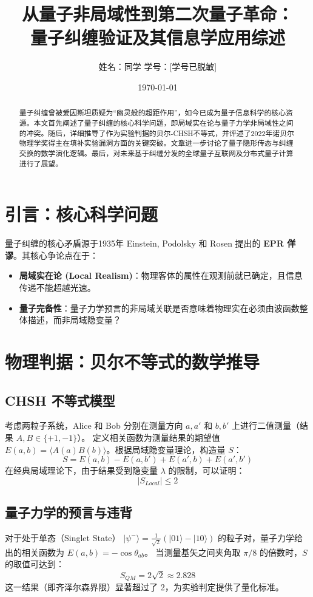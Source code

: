 \documentclass[11pt,a4paper]{article}
\title{\Large \textbf{从量子非局域性到第二次量子革命：\\量子纠缠验证及其信息学应用综述}}
\author{姓名：同学 \quad 学号：[学号已脱敏]}
\date{\today}
\begin{document}
\maketitle

\begin{abstract}
量子纠缠曾被爱因斯坦质疑为“幽灵般的超距作用”，如今已成为量子信息科学的核心资源。本文首先阐述了量子纠缠的核心科学问题，即局域实在论与量子力学非局域性之间的冲突。随后，详细推导了作为实验判据的贝尔-CHSH不等式，并评述了2022年诺贝尔物理学奖得主在填补实验漏洞方面的关键突破。文章进一步讨论了量子隐形传态与纠缠交换的数学演化逻辑。最后，对未来基于纠缠分发的全球量子互联网及分布式量子计算进行了展望。
\end{abstract}

\section{引言：核心科学问题}
量子纠缠的核心矛盾源于1935年 Einstein, Podolsky 和 Rosen 提出的 \textbf{EPR 佯谬}。其核心争论点在于：
\begin{itemize}
    \item \textbf{局域实在论 (Local Realism)}：物理客体的属性在观测前就已确定，且信息传递不能超越光速。
    \item \textbf{量子完备性}：量子力学预言的非局域关联是否意味着物理实在必须由波函数整体描述，而非局域隐变量？
\end{itemize}

\section{物理判据：贝尔不等式的数学推导}


\subsection{CHSH 不等式模型}
考虑两粒子系统，Alice 和 Bob 分别在测量方向 $a, a'$ 和 $b, b'$ 上进行二值测量（结果 $A, B \in \{+1, -1\}$）。
定义相关函数为测量结果的期望值 $E(a, b) = \langle A(a)B(b) \rangle$。根据局域隐变量理论，构造量 $S$：
\begin{equation}
    S = E(a, b) - E(a, b') + E(a', b) + E(a', b')
\end{equation}
在经典局域理论下，由于结果受到隐变量 $\lambda$ 的限制，可以证明：
\begin{equation}
    |S_{Local}| \leq 2
\end{equation}

\subsection{量子力学的预言与违背}
对于处于单态（Singlet State） $|\psi^-\rangle = \frac{1}{\sqrt{2}}(|01\rangle - |10\rangle)$ 的粒子对，量子力学给出的相关函数为 $E(a,b) = -\cos \theta_{ab}$。
当测量基矢之间夹角取 $\pi/8$ 的倍数时，$S$ 的取值可达到：
\begin{equation}
    S_{QM} = 2\sqrt{2} \approx 2.828
\end{equation}
这一结果（即齐泽尔森界限）显著超过了 2，为实验判定提供了量化标准。
\end{document}
